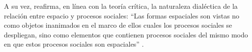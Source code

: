 A su vez, reafirma, en línea con la teoría crítica, la naturaleza dialéctica de la relación entre espacio y procesos sociales:  “Las formas espaciales son vistas no como objetos inanimados en el marco de ellos cuales los procesos sociales se despliegan, sino como elementos que contienen procesos sociales del mismo modo en que estos procesos sociales son espaciales” \cite[~3]{harvey}.





